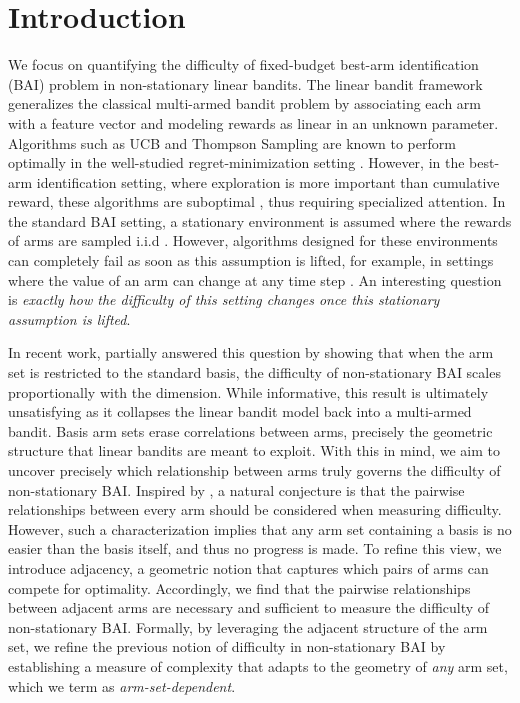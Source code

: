 \section{Introduction} \label{sec:intro}
 We focus on quantifying the difficulty of fixed-budget best-arm identification (BAI) problem in non-stationary linear bandits. The linear bandit framework generalizes the classical multi-armed bandit problem by associating each arm with a feature vector and modeling rewards as linear in an unknown parameter. Algorithms such as UCB and Thompson Sampling are known to perform optimally in the well-studied regret-minimization setting \citep{lattimore2020bandit}. However, in the best-arm identification setting, where exploration is more important than cumulative reward, these algorithms are suboptimal \citep{bubeck2009pure}, thus requiring specialized attention. In the standard BAI setting, a stationary environment is assumed where the rewards of arms are sampled i.i.d \citep{audibert2010best, soare2014best, NEURIPS2019_8ba6c657}. However, algorithms designed for these environments can completely fail as soon as this assumption is lifted, for example, in settings where the value of an arm can change at any time step \citep{abbasi2018best,xiong2024b}. An interesting question is \emph{exactly how the difficulty of this setting changes once this stationary assumption is lifted}. 

In recent work, \citet{xiong2024b} partially answered this question by showing that when the arm set is restricted to the standard basis, the difficulty of non-stationary BAI scales proportionally with the dimension. While informative, this result is ultimately unsatisfying as it collapses the linear bandit model back into a multi-armed bandit. Basis arm sets erase correlations between arms, precisely the geometric structure that linear bandits are meant to exploit. With this in mind, we aim to uncover precisely which relationship between arms truly governs the difficulty of non-stationary BAI. Inspired by \citet{soare2014best}, a natural conjecture is that the pairwise relationships between every arm should be considered when measuring difficulty. However, such a characterization implies that any arm set containing a basis is no easier than the basis itself, and thus no progress is made. To refine this view, we introduce adjacency, a geometric notion that captures which pairs of arms can compete for optimality. Accordingly, we find that the pairwise relationships between adjacent arms are necessary and sufficient to measure the difficulty of non-stationary BAI. Formally, by leveraging the adjacent structure of the arm set, we refine the previous notion of difficulty in non-stationary BAI by establishing a measure of complexity that adapts to the geometry of \textit{any} arm set, which we term as \textit{arm-set-dependent}.


